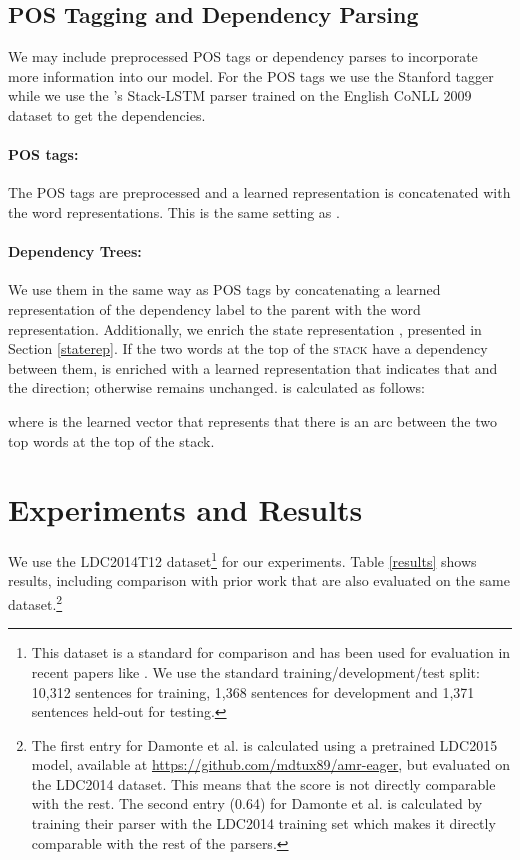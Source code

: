 \documentclass[11pt,a4paper]{article}
\begin{document}
  
 \subsection{POS Tagging and Dependency Parsing}
 
 We may include preprocessed POS tags or dependency parses to incorporate more information into our model.  
For the POS tags we use the Stanford tagger \cite{Toutanova:2003:FPT:1073445.1073478} while we use the 
 's Stack-LSTM parser trained on the English CoNLL 2009 
 dataset \cite{Hajic:2009:CST:1596409.1596411} to get the dependencies.
 


 \paragraph{POS tags:} The POS
  tags are preprocessed and a learned representation  is concatenated with the word 
  representations. This is the same setting as \cite{lstmacl15}.

\paragraph{Dependency Trees:}  We use them in the same way as POS tags by concatenating a 
learned representation  of the dependency label to the parent with the word 
representation. Additionally, we enrich the state representation , 
 presented in Section \ref{staterep}. If the two words at the top of the \textsc{stack} have  a 
 dependency between them,  is enriched 
 with a learned representation that indicates that and the 
direction; otherwise  remains unchanged.
  is calculated as follows:


\noindent where  is the learned vector that represents that there is an 
arc between the two top words at the top of the stack.
 
\section{Experiments and Results}

We use the LDC2014T12 dataset\footnote{This dataset is a standard for comparison and has been used for 
evaluation in recent papers like \cite{WangXP15, 
goodman-vlachos-naradowsky:2016:P16-1,zhouemnlp}. We use the standard training/development/test
split: 10,312 sentences for training, 1,368 sentences
for development and 1,371 sentences held-out for
testing. } for our experiments. Table \ref{results} shows results, 
including comparison with prior work that are also evaluated on the same 
dataset.\footnote{The first entry for Damonte et al. is calculated using a pretrained LDC2015 
model, available at \url{https://github.com/mdtux89/amr-eager}, but evaluated on the LDC2014 dataset. 
This means that the score is not directly comparable with the rest. The second entry (0.64)
for Damonte et al. is calculated by training their parser with the LDC2014 training set which makes it directly 
comparable with the rest of the parsers.} 
\end{document}

